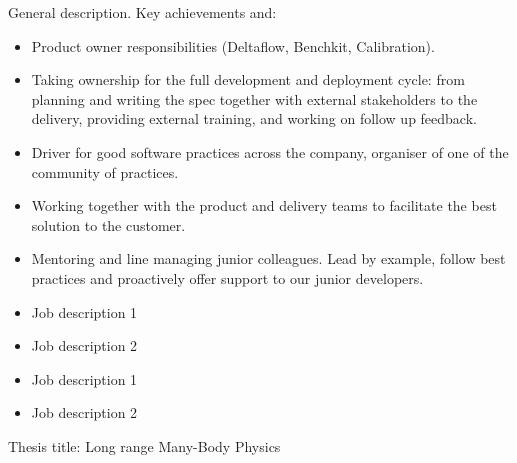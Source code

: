 \documentclass[10pt,a4paper,ragged2e,withhyper]{altacv}
\begin{document}
\begin{paracol}{2}


General description. Key achievements and:
\begin{itemize}
    \item Product owner responsibilities (Deltaflow, Benchkit, Calibration).
    \item Taking ownership for the full development and deployment cycle: from planning
    and writing the spec together with external stakeholders to the delivery,
    providing external training, and working on follow up feedback.
    \item Driver for good software practices across the company, organiser of one of
    the community of practices.
    \item Working together with the product and delivery teams to facilitate the
    best solution to the customer.
    \item Mentoring and line managing junior colleagues. Lead by example, follow best
    practices and proactively offer support to our junior developers.
\end{itemize}

\divider

\begin{itemize}
    \item Job description 1
    \item Job description 2
\end{itemize}

\begin{itemize}
    \item Job description 1
    \item Job description 2
\end{itemize}


Thesis title: Long range Many-Body Physics

\divider



\end{paracol}
\end{document}
